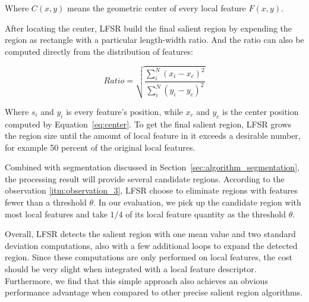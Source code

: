 Where $C(x, y)$ means the geometric center of every local feature $F(x, y)$.

After locating the center, LFSR build the final salient region by expending the region as rectangle with a particular length-width ratio. And the ratio can also be computed directly from the distribution of features:

{\begin{equation} \label{eq:ratio}
Ratio = \sqrt{\frac{\sum_{i}^{N}\left ( x_{i}-x_{c} \right )^{2}}{\sum_{i}^{N}\left ( y_{i}-y_{c} \right )^{2}}}
\end{equation}}

Where $s_{i}$ and $y_{i}$ is every feature's position, while $x_{c}$ and $y_{c}$ is the center position computed by Equation~\ref{eq:center}. To get the final salient region, LFSR grows the region size until the amount of local feature in it exceeds a desirable number, for example 50 percent of the original local features.

Combined with segmentation discussed in Section~\ref{sec:algorithm_segmentation}, the processing result will provide several candidate regions. According to the observation \ref{itm:observation_3}, LFSR choose to eliminate regions with features fewer than a threshold $\theta$. In our evaluation, we pick up the candidate region with most local features and take $1/4$ of its local feature quantity as the threshold $\theta$.

Overall, LFSR detects the salient region with one mean value and two standard deviation computations, also with a few additional loops to expand the detected region. Since these computations are only performed on local features, the cost should be very slight when integrated with a local feature descriptor. Furthermore, we find that this simple approach also achieves an obvious performance advantage when compared to other precise salient region algorithms.